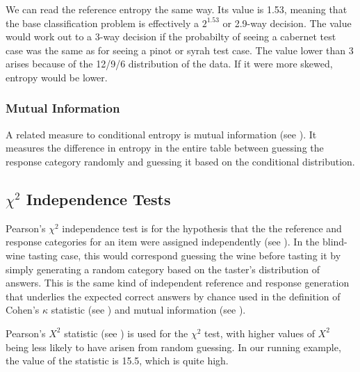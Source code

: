 We can read the reference entropy the same way.  Its value is 1.53,
meaning that the base classification problem is effectively a
$2^{1.53}$ or 2.9-way decision.  The value would work out to a 3-way
decision if the probabilty of seeing a cabernet test case was the same
as for seeing a pinot or syrah test case.  The value lower than
3 arises because of the 12/9/6 distribution of the data.  If it were
more skewed, entropy would be lower.

\subsubsection{Mutual Information}\label{section:classifier-eval-mutual-info}

A related measure to conditional entropy is mutual information (see
).  It measures the difference in
entropy in the entire table between guessing the response category
randomly and guessing it based on the conditional distribution.  


\subsection{$\chi^2$ Independence Tests}

Pearson's $\chi^2$ independence test is for the hypothesis that the
the reference and response categories for an item were assigned
independently (see ).  In the
blind-wine tasting case, this would correspond guessing the wine
before tasting it by simply generating a random category based on the
taster's distribution of answers.  This is the same kind of
independent reference and response generation that underlies the
expected correct answers by chance used in the definition of Cohen's
$\kappa$ statistic (see ) and mutual
information (see ).

Pearson's $X^2$ statistic (see
) is used for the $\chi^2$
test, with higher values of $X^2$ being less likely to have arisen
from random guessing.  In our running example, the value of the
statistic is 15.5, which is quite high.  

